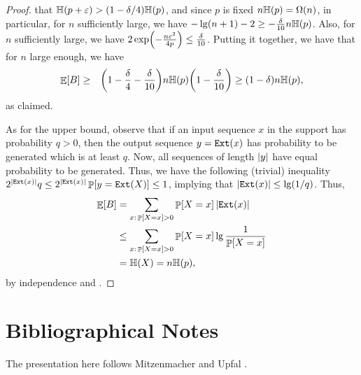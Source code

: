 \begin{proof}
    that $\Entropy{p+\eps} > (1-\delta/4) \Entropy{p}$, and since $p$
    is fixed $n \Entropy{p} = \Omega(n)$, in particular, for $n$
    sufficiently large, we have $- \lg\pth{n+1}-2\geq -
    \frac{\delta}{10}n \Entropy{p}$. Also, for $n$ sufficiently large,
    we have $2\exp \pth{ -\frac{n\eps^2}{4p} } \leq
    \frac{\delta}{10}$. Putting it together, we have that for $n$
    large enough, we have
    \begin{eqnarray*}
        \Ex{B} &\geq &
        \pth{ 1-\frac{\delta}{4}  - \frac{\delta}{10} } n   \Entropy{p}
        \pth{1 - \frac{\delta}{10} } \geq \pth{ 1- \delta} n \Entropy{p},
    \end{eqnarray*}
    as claimed.

    As for the upper bound, observe that if an input sequence $x$ in the support has
    probability $q>0$, then the output sequence $y = \mathtt{E{x}t}(x)$ has
    probability to be generated which is at least $q$.  Now, all
    sequences of length $\left| {y} \right|$ have equal probability to be
    generated.  Thus, we have the following (trivial) inequality
    $2^{\cardin{\ExtractFunc(x)}} q \leq 2^{\cardin{\ExtractFunc(x)}}
    \Prob{y = \ExtractFunc(X)} \leq 1$, implying that
    $\left| {\mathtt{E{x}t}(x)} \right| \leq \lg(1/q)$. Thus,
    \begin{align*}
        \Ex{B}
        &=
        \sum_{x:\,\Prob{X=x}>0} \Prob{X = x} \cardin{\ExtractFunc(x)}%
        \\&\leq
        \sum_{x:\,\Prob{X=x}>0} \Prob{X = x} \lg \frac{1}{\Prob{X=x}}%
        \\&=
        \Entropy{X}=n\Entropy{p},
    \end{align*}
    by independence and .
\end{proof}





\section{Bibliographical Notes}

The presentation here follows Mitzenmacher and Upfal \cite[Sec. 9.1-Sec
9.3]{mu-pcrap-05}.


\ChapterEnd{}

%
